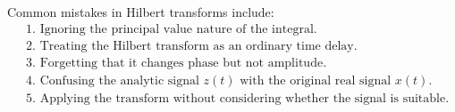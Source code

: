 \begin{conceptbox}
    Common mistakes in Hilbert transforms include:
    \[
        \begin{aligned}
             & \text{1. Ignoring the principal value nature of the integral.}                             \\
             & \text{2. Treating the Hilbert transform as an ordinary time delay.}                        \\
             & \text{3. Forgetting that it changes phase but not amplitude.}                              \\
             & \text{4. Confusing the analytic signal } z(t) \text{ with the original real signal } x(t). \\
             & \text{5. Applying the transform without considering whether the signal is suitable.}
        \end{aligned}
    \]
\end{conceptbox}